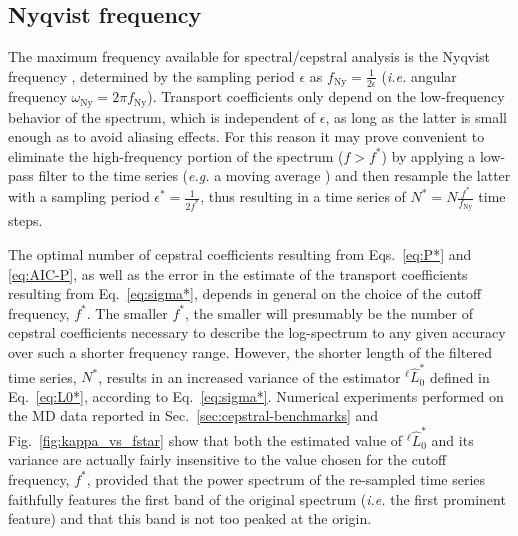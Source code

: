 \subsection{Nyqvist frequency}  \label{sec:cepstral-nyqvist}
The maximum frequency available for spectral/cepstral analysis is the Nyqvist frequency \cite{Oppenheim1999}, determined by the sampling period $\epsilon$ as $f_{\mathrm{Ny}}=\frac{1}{2\epsilon}$ (\emph{i.e.} angular frequency $\omega_{\mathrm{Ny}}=2\pi f_{\mathrm{Ny}}$). Transport coefficients only depend on the low-frequency behavior of the spectrum, which is independent of $\epsilon$, as long as the latter is small enough as to avoid aliasing effects. For this reason it may prove convenient to eliminate the high-frequency portion of the spectrum ($f>f^*$) by applying a low-pass filter to the time series (\emph{e.g.} a moving average \cite{MovingAverage}) and then resample the latter with a sampling period $\epsilon^*=\frac{1}{2f^*}$, thus resulting in a time series of $N^*=N\frac{f^*}{f_{\mathrm{Ny}}}$ time steps.

The optimal number of cepstral coefficients resulting from Eqs.~\eqref{eq:P*} and \eqref{eq:AIC-P}, as well as the error in the estimate of the transport coefficients resulting from Eq.~\eqref{eq:sigma*}, depends in general on the choice of the cutoff frequency, $f^*$. The smaller $f^*$, the smaller will presumably be the number of cepstral coefficients necessary to describe the log-spectrum to any given accuracy over such a shorter frequency range. However, the shorter length of the filtered time series, $N^*$, results in an increased variance of the estimator $^\ell{\hat L^*_0}$ defined in Eq.~\eqref{eq:L0*}, according to Eq.~\eqref{eq:sigma*}. Numerical experiments performed on the MD data reported in Sec.~\ref{sec:cepstral-benchmarks} and Fig.~\ref{fig:kappa_vs_fstar} show that both the estimated value of $^\ell{\hat L^*_0}$ and its variance are actually fairly insensitive to the value chosen for the cutoff frequency, $f^*$, provided that the power spectrum of the re-sampled time series faithfully features the first band of the original spectrum (\emph{i.e.} the first prominent feature) and that this band is not too peaked at the origin.


